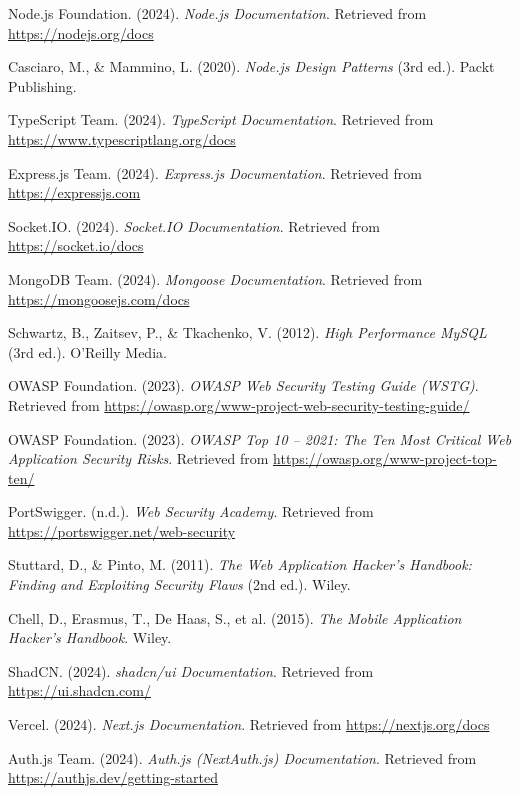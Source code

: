 \begin{thebibliography}{9}

    Node.js Foundation. (2024). \textit{Node.js Documentation}. Retrieved from \url{https://nodejs.org/docs}
    
    Casciaro, M., \& Mammino, L. (2020). \textit{Node.js Design Patterns} (3rd ed.). Packt Publishing.
    
    TypeScript Team. (2024). \textit{TypeScript Documentation}. Retrieved from \url{https://www.typescriptlang.org/docs}
    
    Express.js Team. (2024). \textit{Express.js Documentation}. Retrieved from \url{https://expressjs.com}
    
    Socket.IO. (2024). \textit{Socket.IO Documentation}. Retrieved from \url{https://socket.io/docs}
    
    MongoDB Team. (2024). \textit{Mongoose Documentation}. Retrieved from \url{https://mongoosejs.com/docs}
    
    Schwartz, B., Zaitsev, P., \& Tkachenko, V. (2012). \textit{High Performance MySQL} (3rd ed.). O'Reilly Media.

    OWASP Foundation. (2023). \textit{OWASP Web Security Testing Guide (WSTG)}. Retrieved from \url{https://owasp.org/www-project-web-security-testing-guide/}

    OWASP Foundation. (2023). \textit{OWASP Top 10 – 2021: The Ten Most Critical Web Application Security Risks}. Retrieved from \url{https://owasp.org/www-project-top-ten/}

    PortSwigger. (n.d.). \textit{Web Security Academy}. Retrieved from \url{https://portswigger.net/web-security}

    Stuttard, D., \& Pinto, M. (2011). \textit{The Web Application Hacker's Handbook: Finding and Exploiting Security Flaws} (2nd ed.). Wiley.

    Chell, D., Erasmus, T., De Haas, S., et al. (2015). \textit{The Mobile Application Hacker's Handbook}. Wiley.

    ShadCN. (2024). \textit{shadcn/ui Documentation}. Retrieved from \url{https://ui.shadcn.com/}

    Vercel. (2024). \textit{Next.js Documentation}. Retrieved from \url{https://nextjs.org/docs}

    Auth.js Team. (2024). \textit{Auth.js (NextAuth.js) Documentation}. Retrieved from \url{https://authjs.dev/getting-started}


\end{thebibliography}
